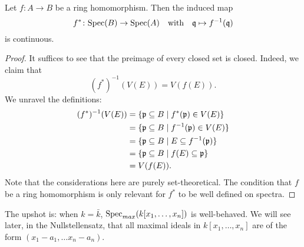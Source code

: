 \begin{prop}
  Let $f \colon A \to B$ be a ring homomorphism. Then the induced map
  \[f^* \colon \text{Spec}(B) \to \text{Spec}(A)
    \quad \text{with} \quad
    \mathfrak q \mapsto f^{-1}(\mathfrak q)\]
  is continuous.
\end{prop}
\begin{proof}
It suffices to see that the preimage of every closed set is closed. Indeed, we claim that
\[ (f^*)^{-1}(V(E)) = V(f(E)).\]
We unravel the definitions:
\begin{align*}
  (f^*)^{-1}(V(E)) & = \{ \mathfrak p \subseteq B \mathrel{|} f^*(\mathfrak p) \in V(E)\} \\
                   & = \{ \mathfrak p \subseteq B \mathrel{|} f^{-1}(\mathfrak p) \in V(E)\} \\
                   & = \{ \mathfrak p \subseteq B \mathrel{|} E \subseteq f^{-1}(\mathfrak p) \} \\
                   & = \{ \mathfrak p \subseteq B \mathrel{|} f(E) \subseteq \mathfrak p\} \\
                   & = V(f(E)).
\end{align*}
Note that the considerations here are purely set-theoretical. The condition that $f$ be a ring homomorphism is only relevant for $f^*$ to be well defined on spectra.
\end{proof}

The upshot is: when $k = \bar k$, $\text{Spec}_{max}(k[x_1, \ldots, x_n])$ is well-behaved. We will see later, in the Nullstellensatz, that all maximal ideals in $k[x_1, \ldots, x_n]$ are of the form $(x_1 - a_1, \ldots x_n - a_n)$.



